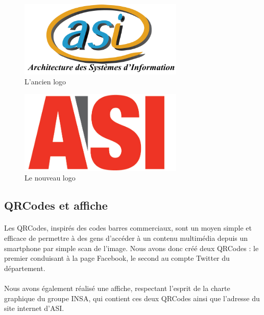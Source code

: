 		\begin{figure}
			\begin{center}
				\includegraphics[width=0.7\textwidth]{images/ancienlogo.png}
				\caption{\label{ancienlogo} L'ancien logo}
			\end{center}
		\end{figure}
		
		\begin{figure}
			\begin{center}
				\includegraphics[width=0.7\textwidth]{images/logo.jpg}
				\caption{\label{nouveaulogo} Le nouveau logo}
			\end{center}
		\end{figure}

	\subsection{QRCodes et affiche}

		\paragraph{}
		Les QRCodes, inspirés des codes barres commerciaux, sont un moyen simple et efficace de permettre à des gens d'accéder à un contenu multimédia depuis un smartphone par simple scan de l'image. 
		Nous avons donc créé deux QRCodes : le premier conduisant à la page Facebook, le second au compte Twitter du département.
		
		\paragraph{}
		Nous avons également réalisé une affiche, respectant l'esprit de la charte graphique du groupe INSA, qui contient ces deux QRCodes ainsi que l'adresse du site internet d'ASI.

